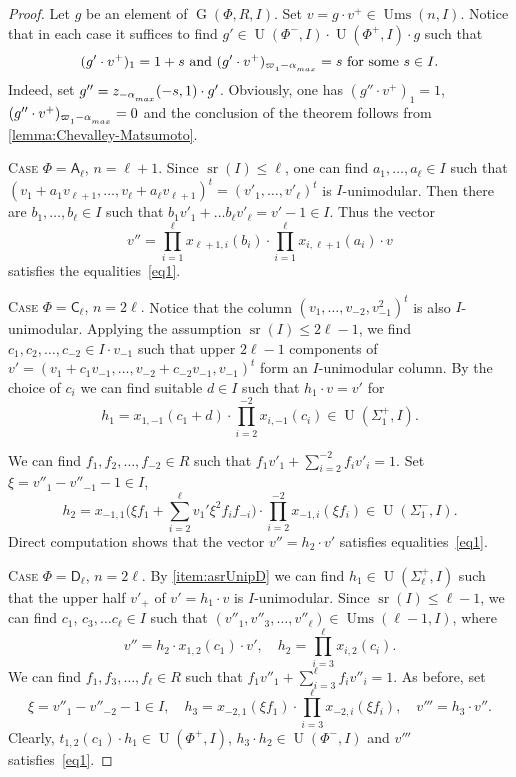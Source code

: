 \documentclass[oneside, 12pt]{amsart}
\theoremstyle{plain}
\numberwithin{equation}{section}
\numberwithin{lemma}{section}
\theoremstyle{definition}
\theoremstyle{remark}
\DeclareMathOperator{\G}{G}
\DeclareMathOperator{\U}{U}
\DeclareMathOperator{\sr}{sr}
\DeclareMathOperator{\Ums}{Ums}
\newcommand{\rA}{\mathsf{A}}
\newcommand{\rC}{\mathsf{C}}
\newcommand{\rD}{\mathsf{D}}
\def\ssub#1{\mathchoice
   {_{\lower2pt\hbox{$\scriptstyle #1$}}}
   {_{\lower2pt\hbox{$\scriptstyle #1$}}}
   {_{\lower1.5pt\hbox{$\scriptscriptstyle #1$}}}
   {_{\!\lower1.5pt\hbox{$\scriptscriptstyle #1$}}}}
\begin{document}
\begin{proof}

Let $g$ be an element of $\G(\Phi, R, I)$. Set $v=g \cdot v^+\in\Ums(n, I)$. 
Notice that in each case it suffices to find $g' \in \U(\Phi^-, I) \cdot \U(\Phi^+, I) \cdot g$ such that 
\begin{equation} \label{eq1} (g'\cdot v^+)_{1} = 1 + s \text{ and } (g'\cdot v^+)_{\varpi\ssub{1}-\alpha\ssub{max}} = s\ \text{for some}\ s\in I. \end{equation}
Indeed, set $g'' = z_{-\alpha\ssub{max}}(-s, 1) \cdot g'$.
Obviously, one has $(g''\cdot v^+)_1 = 1$, $(g''\cdot v^+)_{\varpi\ssub{1}-\alpha\ssub{max}}=0$ and the conclusion of the theorem follows from \cref{lemma:Chevalley-Matsumoto}.

\textsc{Case $\Phi=\rA_\ell$, $n=\ell + 1$.}
Since $\sr(I)\leqslant\ell$, one can find $a_1, \ldots, a_\ell\in I$ such that $(v_1+a_1v_{\ell+1}, \ldots, v_\ell+a_\ell v_{\ell+1})^t=(v'_1, \ldots, v'_\ell)^t$ is $I$-unimodular.
Then there are $b_1, \ldots, b_\ell\in I$ such that $b_1v'_1+\ldots b_\ell v'_\ell=v'-1\in I$. 
Thus the vector \[ v'' = \prod_{i=1}^\ell x_{\ell+1, i}(b_i) \cdot \prod_{i=1}^\ell x_{i, \ell+1}(a_i) \cdot v \]
satisfies the equalities~\eqref{eq1}.

\textsc{Case $\Phi=\rC_\ell$, $n=2\ell$.}
Notice that the column $(v_1, \ldots, v_{-2}, v_{-1}^2)^t$ is also $I$-unimodular.
Applying the assumption $\sr(I)\leqslant 2\ell-1$, we find $c_1, c_2, \ldots, c_{-2} \in I \cdot v_{-1}$ such that upper $2\ell -1$ components of $v'=(v_1 + c_1 v_{-1}, \ldots, v_{-2} + c_{-2}v_{-1}, v_{-1})^t$ form an $I$-unimodular column.
By the choice of $c_i$ we can find suitable $d\in I$ such that $h_1 \cdot v = v'$ for
\[ h_1 = x_{1, -1}(c_1 + d) \cdot \prod_{i=2}^{-2} x_{i, -1}(c_i) \in \U(\Sigma_1^+, I). \]

We can find $f_1, f_2, \ldots, f_{-2} \in R$ such that $f_1v'_1+\sum_{i=2}^{-2} f_i v'_i = 1$.
Set $\xi = v''_1-v''_{-1}-1 \in I$, 
\[ h_2 = x_{-1, 1}\biggl(\xi f_1 + \sum_{i=2}^\ell v_1' \xi^2 f_i f_{-i}\biggr) \cdot \prod_{i=2}^{-2} x_{-1, i}(\xi f_i) \in \U(\Sigma_1^-, I). \]
Direct computation shows that the vector $v'' = h_2 \cdot v'$ satisfies equalities~\eqref{eq1}.

\textsc{Case $\Phi=\rD_\ell$, $n= 2\ell$.} 
By \cref{item:asrUnipD} we can find $h_1\in \U(\Sigma^+_\ell, I)$ such that the upper half $v'_+$ of $v'=h_1 \cdot v$ is $I$-unimodular.
Since $\sr(I)\leqslant \ell-1$, we can find $c_1$, $c_3, \ldots c_\ell \in I$ such that $(v''_1, v''_3, \ldots, v''_\ell) \in \Ums(\ell-1, I)$, where
\[ v''=h_2 \cdot x_{1, 2}(c_1) \cdot v', \quad h_2=\prod_{i=3}^\ell x_{i, 2}(c_i). \]
We can find $f_1, f_3, \ldots, f_\ell \in R$ such that $f_1v''_1+\sum_{i=3}^\ell f_i v''_{i} = 1$.
As before, set
\[ \xi = v''_1-v''_{-2}-1 \in I, \quad h_3 = x_{-2, 1}(\xi f_1) \cdot \prod_{i=3}^\ell x_{-2, i}(\xi f_i), \quad v'''=h_3 \cdot v''. \]
Clearly, $t_{1, 2}(c_1) \cdot h_1 \in \U(\Phi^+, I)$, $ h_3 \cdot h_2 \in \U(\Phi^-, I)$ and $v'''$ satisfies~\eqref{eq1}.


\end{proof}
\end{document}
